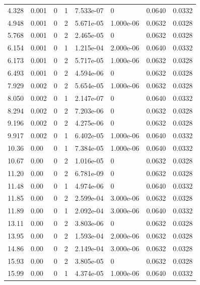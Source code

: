 \documentclass[preview]{standalone}
\begin{document}
{{\begin{tabular}{L{1.2cm}C{1.2cm} C{0.3cm}C{0.5cm} C{1.4cm}C{1.4cm} C{1.4cm}C{1.4cm}}
  4.328  &  0.001  & 0     &  1 &  7.533e-07  & 0  & 0.0640 &  0.0332   \\ 
  4.948  &  0.001  & 0     &  2 &  5.671e-05  & 1.000e-06  & 0.0632 &  0.0328   \\ 
  5.768  &  0.001  & 0     &  2 &  2.465e-05  & 0  & 0.0632 &  0.0328   \\ 
  6.154  &  0.001  & 0     &  1 &  1.215e-04  & 2.000e-06  & 0.0640 &  0.0332   \\ 
  6.173  &  0.001  & 0     &  2 &  5.717e-05  & 1.000e-06  & 0.0632 &  0.0328   \\ 
  6.493  &  0.001  & 0     &  2 &  4.594e-06  & 0  & 0.0632 &  0.0328   \\ 
  7.929  &  0.002  & 0     &  2 &  5.654e-05  & 1.000e-06  & 0.0632 &  0.0328   \\ 
  8.050  &  0.002  & 0     &  1 &  2.147e-07  & 0  & 0.0640 &  0.0332   \\ 
  8.294  &  0.002  & 0     &  2 &  7.203e-06  & 0  & 0.0632 &  0.0328   \\ 
  9.196  &  0.002  & 0     &  2 &  4.275e-06  & 0  & 0.0632 &  0.0328   \\ 
  9.917  &  0.002  & 0     &  1 &  6.402e-05  & 1.000e-06  & 0.0640 &  0.0332   \\ 
  10.36  &  0.00  & 0     &  1 &  7.384e-05  & 1.000e-06  & 0.0640 &  0.0332   \\ 
  10.67  &  0.00  & 0     &  2 &  1.016e-05  & 0  & 0.0632 &  0.0328   \\ 
  11.20  &  0.00  & 0     &  2 &  6.781e-09  & 0  & 0.0632 &  0.0328   \\ 
  11.48  &  0.00  & 0     &  1 &  4.974e-06  & 0  & 0.0640 &  0.0332   \\ 
  11.85  &  0.00  & 0     &  2 &  2.599e-04  & 3.000e-06  & 0.0632 &  0.0328   \\ 
  11.89  &  0.00  & 0     &  1 &  2.092e-04  & 3.000e-06  & 0.0640 &  0.0332   \\ 
  13.11  &  0.00  & 0     &  2 &  3.803e-06  & 0  & 0.0632 &  0.0328   \\ 
  13.95  &  0.00  & 0     &  2 &  1.593e-04  & 2.000e-06  & 0.0632 &  0.0328   \\ 
  14.86  &  0.00  & 0     &  2 &  2.149e-04  & 3.000e-06  & 0.0632 &  0.0328   \\ 
  15.93  &  0.00  & 0     &  2 &  3.805e-05  & 0  & 0.0632 &  0.0328   \\ 
  15.99  &  0.00  & 0     &  1 &  4.374e-05  & 1.000e-06  & 0.0640 &  0.0332   \\ 

\end{tabular}}}
\end{document}
